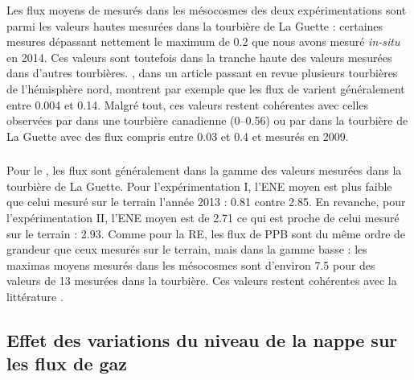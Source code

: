 Les flux moyens de \chh mesurés dans les mésocosmes des deux expérimentations sont parmi les valeurs hautes mesurées dans la tourbière de La Guette : certaines mesures dépassant nettement le maximum de \SI{0.2}{\uml} que nous avons mesuré \textit{in-situ} en 2014.
Ces valeurs sont toutefois dans la tranche haute des valeurs mesurées dans d'autres tourbières.
\citet{blodau2002}, dans un article passant en revue plusieurs tourbières de l'hémisphère nord, montrent par exemple que les flux de \chh varient généralement entre \num{0.004} et \SI{0.14}{\uml}.
Malgré tout, ces valeurs restent cohérentes avec celles observées par \citet{lai2014} dans une tourbière canadienne (\num{0}--\SI{0.56}{\uml}) ou par \citet{gogo2011a} dans la tourbière de La Guette avec des flux compris entre \num{0.03} et \SI{0.4}{\uml} et mesurés en 2009.

\subsubsection{\coo}

Pour le \coo, les flux sont généralement dans la gamme des valeurs mesurées dans la tourbière de La Guette.
Pour l'expérimentation I, l'ENE moyen est plus faible que celui mesuré sur le terrain l'année 2013 : \num{0.81} contre \SI{2.85}{\uml}.
En revanche, pour l'expérimentation II, l'ENE moyen est de \SI{2.71}{\uml} ce qui est proche de celui mesuré sur le terrain : \SI{2.93}{\uml}.
Comme pour la RE, les flux de PPB sont du même ordre de grandeur que ceux mesurés sur le terrain, mais dans la gamme basse : les maximas moyens mesurés dans les mésocosmes sont d'environ \num{7.5} pour des valeurs de \SI{13}{\uml} mesurées dans la tourbière.
Ces valeurs restent cohérentes avec la littérature \citep{bortoluzzi2006a} \plop.

%



\subsection{Effet des variations du niveau de la nappe sur les flux de gaz}

